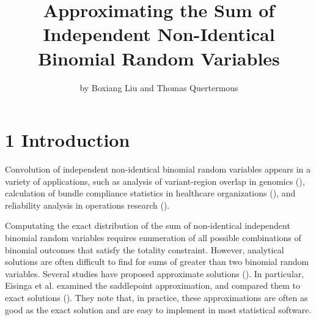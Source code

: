 \title{Approximating the Sum of Independent Non-Identical Binomial Random Variables}
\author{by Boxiang Liu and Thomas Quertermous}

\maketitle


\section{1 Introduction}

Convolution of independent non-identical binomial random variables appears in a variety of applications, such as analysis of variant-region overlap in genomics (\cite{Schmidt:2015ca}), calculation of bundle compliance statistics in healthcare organizations (\cite{Benneyan:2010ex}), and reliability analysis in operations research (\cite{Anonymous:iz}). 

Computating the exact distribution of the sum of non-identical independent binomial random variables requires enumeration of all possible combinations of binomial outcomes that satisfy the totality constraint. However, analytical solutions are often difficult to find for sums of greater than two binomial random variables. Several studies have proposed approximate solutions  (\cite{Johnson:2005hg,Jolayemi:1992jz}). In particular, Eisinga et al. examined  the saddlepoint approximation, and compared them to exact solutions (\cite{Eisinga:2013da}). They note that, in practice, these approximations are often as good as the exact solution and are easy to implement in most statistical software. 

